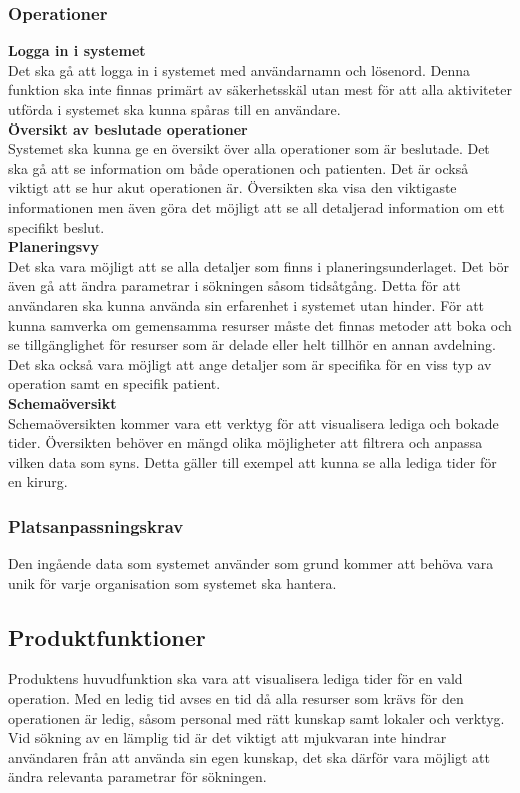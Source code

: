 \documentclass{article}
\begin{document}
\subsubsection{Operationer}
\label{subsec:Operationer}
\textbf{Logga in i systemet}\\
Det ska gå att logga in i systemet med användarnamn och lösenord. Denna
funktion ska inte finnas primärt av säkerhetsskäl utan mest för att alla
aktiviteter utförda i systemet ska kunna spåras till en användare.\\
\textbf{Översikt av beslutade operationer}\\
Systemet ska kunna ge en översikt över alla operationer som är beslutade.
Det ska gå att se information om både operationen och patienten. Det är också
viktigt att se hur akut operationen är. Översikten ska visa den viktigaste
informationen men även göra det möjligt att se all detaljerad information om ett specifikt beslut.\\
\textbf{Planeringsvy}\\
Det ska vara möjligt att se alla detaljer som finns i planeringsunderlaget.
Det bör även gå att ändra parametrar i sökningen såsom tidsåtgång. Detta för
att användaren ska kunna använda sin erfarenhet i systemet utan hinder.
För att kunna samverka om gemensamma resurser måste det finnas metoder att boka
och se tillgänglighet för resurser som är delade eller helt tillhör en annan
avdelning. Det ska också vara möjligt att ange detaljer som är specifika för en
viss typ av operation samt en specifik patient.\\
\textbf{Schemaöversikt}\\
Schemaöversikten kommer vara ett verktyg för att visualisera lediga och bokade
tider.
Översikten behöver en mängd olika möjligheter att filtrera och anpassa vilken
data som syns. Detta gäller till exempel att kunna se alla lediga tider för en
kirurg.\\
\subsubsection{Platsanpassningskrav}
\label{subsec:Platsanpassningskrav}
Den ingående data som systemet använder som grund kommer att behöva vara unik
för varje organisation som systemet ska hantera.
\subsection{Produktfunktioner}
\label{subsec:Produktfunktioner}
Produktens huvudfunktion ska vara att visualisera lediga tider för en vald
operation. Med en ledig tid avses en tid då alla resurser som krävs för den
operationen är ledig, såsom personal med rätt kunskap samt lokaler och verktyg.
Vid sökning av en lämplig tid är det viktigt att mjukvaran inte hindrar
användaren från att använda sin egen kunskap, det ska därför vara möjligt att
ändra relevanta parametrar för sökningen.
\end{document}
